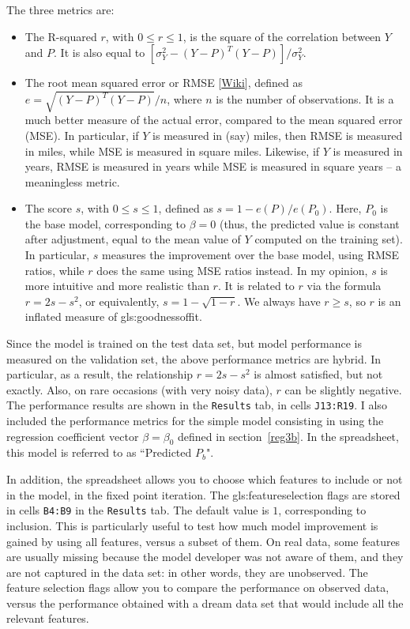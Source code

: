 \documentclass[oneside,10pt]{book}
\begin{document}
\noindent The three metrics are:
\begin{itemize}
\item The R-squared $r$, with $0\leq r\leq 1$, is the square of the correlation between $Y$ and $P$. It is also equal to $[\sigma^2_Y - (Y-P)^T (Y-P)]/\sigma_Y^2.$
\item The root mean squared error or RMSE [\href{https://en.wikipedia.org/wiki/Root-mean-square_deviation}{Wiki}], defined as $e = \sqrt{(Y-P)^T (Y-P)}/n$, where $n$ is the number of observations. It is a much better measure of the actual error, compared to the mean squared error (MSE). In particular, if $Y$ is measured in (say) miles,
then RMSE is measured in miles, while MSE is measured in square miles. Likewise, if $Y$ is measured in years, RMSE is measured in years  while MSE is measured in square years -- a meaningless metric.
\item The score $s$, with $0\leq s \leq 1$, defined as $s=1-e(P)/e(P_0)$. Here, $P_0$ is the base model, corresponding to $\beta=0$ (thus, the predicted value is constant after adjustment, equal to the mean value of $Y$ computed on the training set). In particular, $s$ measures the improvement over the base model, using RMSE ratios, while $r$ does the same using MSE ratios instead. In my opinion, $s$ is more intuitive and more realistic than $r$. It is related to $r$ via the formula $r=2s-s^2$, or equivalently, $s=1-\sqrt{1-r}$. We always have $r\geq s$, so $r$ is an inflated measure of  \gls{gls:goodnessoffit}.
\end{itemize}
Since the model is trained on the test data set, but model performance is measured on the validation set, the above performance metrics are hybrid.
In particular, as a result, the relationship $r=2s-s^2$ is almost satisfied, but not exactly. Also, on rare occasions (with very noisy data), $r$ can be slightly negative. The performance results are shown in the \texttt{Results} tab, in cells \texttt{J13:R19}. I also included the performance metrics for the simple model consisting in using the regression coefficient vector $\beta=\beta_0$
defined in section~\ref{reg3b}. In the spreadsheet, this model is referred to as ``Predicted $P_b$".

In addition, the spreadsheet allows you to choose which features to include or not in the model, in the fixed point iteration. The \gls{gls:featureselection} flags are stored in cells \texttt{B4:B9} in the \texttt{Results} tab. The default value is $1$, corresponding to inclusion. This is particularly useful to test how much model improvement is gained by using all features, versus a subset of them. On real data, some features are usually missing because the model developer was not aware of them, and they are not captured in the data set: in other words, they are unobserved. The feature selection flags allow you to compare the performance on observed data, versus the performance obtained with a dream data set that would include all the relevant features.
\end{document}
